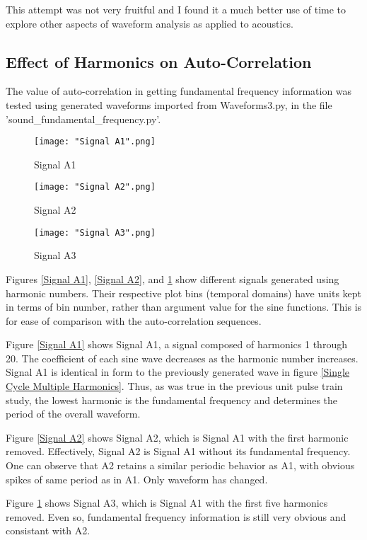 \documentclass[12pt]{article}
\begin{document}
This attempt was not very fruitful and I found it a much better use of time to explore other aspects of waveform analysis as applied to acoustics.

\subsection{Effect of Harmonics on Auto-Correlation}

The value of auto-correlation in getting fundamental frequency information was tested using generated waveforms imported from Waveforms3.py, in the file 'sound\_fundamental\_frequency.py'.

\begin{figure}[H]
    \texttt{[image: "Signal A1".png]}
    \caption{Signal A1}\label{Signal A1}
    \endminipage\hfill
    \texttt{[image: "Signal A2".png]}
    \caption{Signal A2}\label{Signal A2}
    \endminipage\hfill
    \texttt{[image: "Signal A3".png]}
    \caption{Signal A3}\label{Signal A3}
    \endminipage\hfill
\end{figure}

Figures \ref{Signal A1}, \ref{Signal A2}, and \ref{Signal A3} show different signals generated using harmonic numbers. Their respective plot bins (temporal domains) have units kept in terms of bin number, rather than argument value for the sine functions. This is for ease of comparison with the auto-correlation sequences.\newline

Figure \ref{Signal A1} shows Signal A1, a signal composed of harmonics 1 through 20. The coefficient of each sine wave decreases as the harmonic number increases. Signal A1 is identical in form to the previously generated wave in figure \ref{Single Cycle Multiple Harmonics}. Thus, as was true in the previous unit pulse train study, the lowest harmonic is the fundamental frequency and determines the period of the overall waveform.\newline

Figure \ref{Signal A2} shows Signal A2, which is Signal A1 with the first harmonic removed. Effectively, Signal A2 is Signal A1 without its fundamental frequency. One can observe that A2 retains a similar periodic behavior as A1, with obvious spikes of same period as in A1. Only waveform has changed.\newline

Figure \ref{Signal A3} shows Signal A3, which is Signal A1 with the first five harmonics removed. Even so, fundamental frequency information is still very obvious and consistant with A2.
\end{document}
